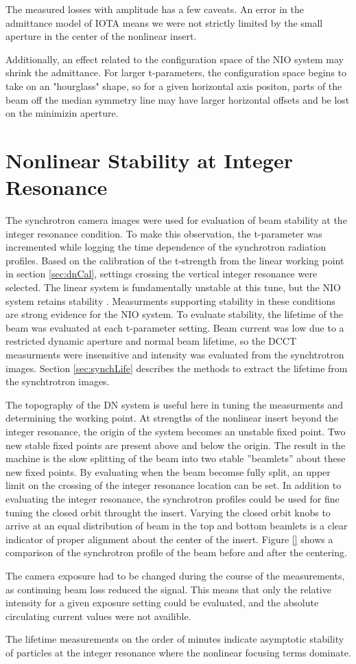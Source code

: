 The measured losses with amplitude has a few caveats. An error in the admittance model of IOTA means we were not strictly limited by the small aperture in the center of the nonlinear insert.

Additionally, an effect related to the configuration space of the NIO system may shrink the admittance. For larger t-parameters, the configuration space begins to take on an "hourglass" shape, so for a given horizontal axis positon, parts of the beam off the median symmetry line may have larger horizontal offsets and be lost on the minimizin aperture.

\section{Nonlinear Stability at Integer Resonance} \label{sec:intCross}
The synchrotron camera images were used for evaluation of beam stability at the integer resonance condition. To make this observation, the t-parameter was incremented while logging the time dependence of the synchrotron radiation profiles. Based on the calibration of the t-strength from the linear working point in section \ref{sec:dnCal}, settings crossing the vertical integer resonance were selected. The linear system is fundamentally unstable at this tune, but the NIO system retains stability . Measurments supporting stability in these conditions are strong evidence for the NIO system. To evaluate stability, the lifetime of the beam was evaluated at each t-parameter setting. Beam current was low due to a restricted dynamic aperture and normal beam lifetime, so the DCCT measurments were insensitive and intensity was evaluated from the synchtrotron images. Section \ref{sec:synchLife} describes the methods to extract the lifetime from the synchtrotron images.

The topography of the DN system is useful here in tuning the measurments and determining the working point. At strengths of the nonlinear insert beyond the integer resonance, the origin of the system becomes an unstable fixed point. Two new stable fixed points are present above and below the origin. The result in the machine is the slow splitting of the beam into two stable ”beamlets” about these new fixed points. By evaluating when the beam becomse fully split, an upper limit on the crossing of the integer resonance location can be set. In addition to evaluating the integer resonance, the synchrotron profiles could be used for fine tuning the closed orbit throught the insert. Varying the closed orbit knobs to arrive at an equal distribution of beam in the top and bottom beamlets is a  clear indicator of proper alignment about the center of the insert. Figure \ref{} shows a comparison of the synchrotron profile of the beam before and after the centering.

The camera exposure had to be changed during the course of the measurements, as continuing beam loss reduced the signal. This means that only the relative intensity for a given exposure setting could be evaluated, and the absolute circulating current values were not availible. 

The lifetime measurements on the order of minutes indicate asymptotic stability of particles at the integer resonance where the nonlinear focusing terms dominate.

